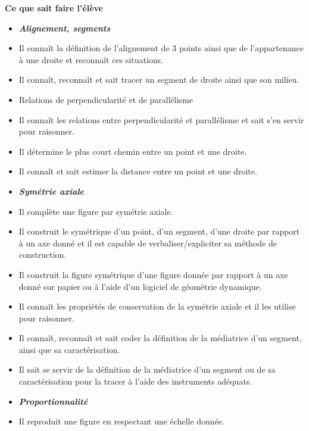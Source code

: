 \documentclass[10pt]{article}
\newcommand{\RR}{\begin{tikzpicture} \draw[Carmin,fill=Carmin] (0,0) circle (0.06); \end{tikzpicture}}
\newenvironment{savoireleves}{%
    \renewcommand{\labelitemi}{\RR}%
    \color{black}%
    \par\textbf{Ce que sait faire l'élève}
    \begin{itemize}
    \setlength{\itemsep}{-0.2em}%
}{
    \end{itemize}
}
\begin{document}
    \begin{savoireleves}
        \item[] \textit{\textbf{Alignement, segments}}
        \item Il connaît la définition de l’alignement de $3$ points ainsi que de l’appartenance à une droite et reconnaît ces situations.
        \item Il connaît, reconnaît et sait tracer un segment de droite ainsi que son milieu.
        \item Relations de perpendicularité et de parallélisme
        \item Il connaît les relations entre perpendicularité et parallélisme et sait s’en servir pour raisonner.
        \item Il détermine le plus court chemin entre un point et une droite.
        \item Il connaît et sait estimer la distance entre un point et une droite.
        \item[] \textit{\textbf{Symétrie axiale}}
        \item Il complète une figure par symétrie axiale.
        \item Il construit le symétrique d’un point, d’un segment, d’une droite par rapport à un axe donné et il est capable de verbaliser/expliciter sa méthode de construction.
        \item Il construit la figure symétrique d’une figure donnée par rapport à un axe donné sur papier ou à l’aide d’un logiciel de géométrie dynamique.
        \item Il connaît les propriétés de conservation de la symétrie axiale et il les utilise pour raisonner.
        \item Il connaît, reconnaît et sait coder la définition de la médiatrice d’un segment, ainsi que sa caractérisation.
        \item Il sait se servir de la définition de la médiatrice d’un segment ou de sa caractérisation pour la tracer à l’aide des instruments adéquats.
        \item[] \textit{\textbf{Proportionnalité}}
        \item Il reproduit une figure en respectant une échelle donnée.
    \end{savoireleves}
\end{document}
